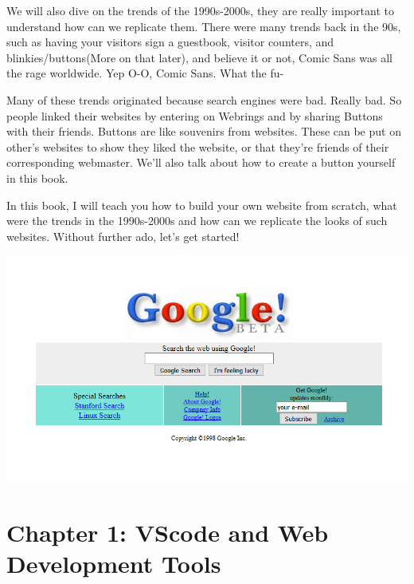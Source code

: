 \documentclass[
  paper=a4,
  ,captions=tableheading
]{scrbook}
\let\origfigure\figure
\let\endorigfigure\endfigure
\renewenvironment{figure}[1][2] {
    \expandafter\origfigure\expandafter[H]
} {
    \endorigfigure
}
\begin{document}
We will also dive on the trends of the 1990s-2000s, they are really
important to understand how can we replicate them. There were many
trends back in the 90s, such as having your visitors sign a guestbook,
visitor counters, and blinkies/buttons(More on that later), and believe
it or not, {Comic Sans} was all the rage worldwide. Yep O-O, Comic Sans.
What the fu-

Many of these trends originated because search engines were bad. Really
bad. So people linked their websites by entering on Webrings and by
sharing Buttons with their friends. Buttons are like souvenirs from
websites. These can be put on other's websites to show they liked the
website, or that they're friends of their corresponding webmaster. We'll
also talk about how to create a button yourself in this book.

In this book, I will teach you how to build your own website from
scratch, what were the trends in the 1990s-2000s and how can we
replicate the looks of such websites. Without further ado, let's get
started!

\begin{figure}
\centering
\includegraphics[width=1\textwidth,height=\textheight]{./tex2pdf.-45885137cafe410a/b955da96d4ab76fb1b756ca84c137b2b054fbd86.png}
\caption{This is how google looked in 1998. Image taken from
https://www.webdesignmuseum.org/exhibitions/web-design-in-the-90s}
\end{figure}

\hypertarget{chapter-1-vscode-and-web-development-tools}{%
\section{Chapter 1: VScode and Web Development
Tools}\label{chapter-1-vscode-and-web-development-tools}}
\end{document}

